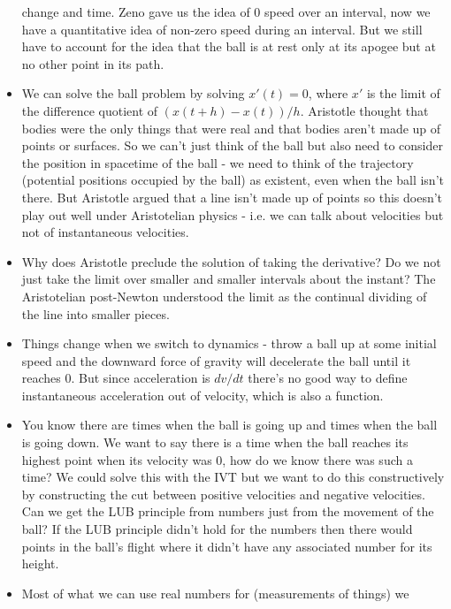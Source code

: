 \documentclass[12pt]{article}
\theoremstyle{definition}
\begin{document}
\begin{itemize}
        change and time. Zeno gave us the idea of 0 speed over an interval, now
        we have a quantitative idea of non-zero speed during an interval. But
        we still have to account for the idea that the ball is at rest only at
        its apogee but at no other point in its path.
    \item 
        We can solve the ball problem by solving $x'(t) = 0$, where $x'$ is the
        limit of the difference quotient of $(x(t + h) - x(t))/h$. Aristotle
        thought that bodies were the only things that were real and that bodies
        aren't made up of points or surfaces. So we can't just think of the
        ball but also need to consider the position in spacetime of the ball -
        we need to think of the trajectory (potential positions occupied by the
        ball) as existent, even when the ball isn't there. But Aristotle argued
        that a line isn't made up of points so this doesn't play out well under
        Aristotelian physics - i.e. we can talk about velocities but not of
        instantaneous velocities.
    \item 
        Why does Aristotle preclude the solution of taking the derivative? Do
        we not just take the limit over smaller and smaller intervals about the
        instant? The Aristotelian post-Newton understood the limit as the
        continual dividing of the line into smaller pieces.
    \item
        Things change when we switch to dynamics - throw a ball up at some
        initial speed and the downward force of gravity will decelerate the
        ball until it reaches 0. But since acceleration is $dv/dt$ there's no
        good way to define instantaneous acceleration out of velocity, which is
        also a function.
    \item
        You know there are times when the ball is going up and times when the
        ball is going down. We want to say there is a time when the ball
        reaches its highest point when its velocity was 0, how do we know there
        was such a time? We could solve this with the IVT but we want to do
        this constructively by constructing the cut between positive velocities
        and negative velocities. Can we get the LUB principle from numbers just
        from the movement of the ball? If the LUB principle didn't hold for the
        numbers then there would points in the ball's flight where it didn't
        have any associated number for its height.
    \item 
        Most of what we can use real numbers for (measurements of things) we

\end{itemize}
\end{document}
